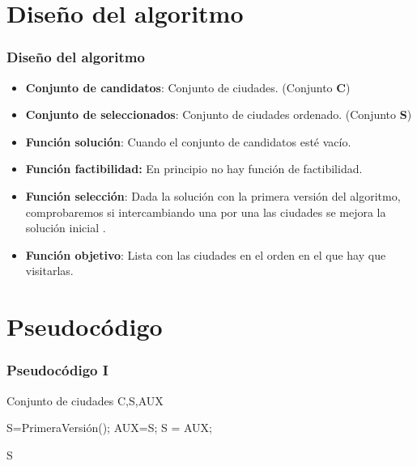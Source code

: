 \documentclass{beamer}
\begin{document}
\section{Diseño del algoritmo} 
\begin{frame}
	\frametitle{Diseño del algoritmo}
	\begin{itemize}
		\item \textbf{Conjunto de candidatos}: Conjunto de ciudades. (Conjunto \textbf{C})
		\item \textbf{Conjunto de seleccionados}: Conjunto de ciudades ordenado. (Conjunto \textbf{S})
		\item \textbf{Función solución}: Cuando el conjunto de candidatos esté vacío.
		\item \textbf{Función factibilidad:} En principio no hay función de factibilidad.
		\item \textbf{Función selección}: Dada la solución con la primera versión del algoritmo, comprobaremos si intercambiando una por una las ciudades se mejora la solución inicial .
		\item \textbf{Función objetivo}: Lista con las ciudades en el orden en el que hay que visitarlas.		
	\end{itemize}
	
\end{frame}

\section{Pseudocódigo}
\begin{frame}
	\frametitle{Pseudocódigo I}
	\begin{algorithmic}				
		\Require Conjunto de ciudades C,S,AUX
		
		\State S=PrimeraVersión();
		\State AUX=S;
			S = AUX;
		\EndIf
	
		\EndFor
		\EndFor  
		
		\Return S	
		
		
		
	\end{algorithmic}
	
	
\end{frame}
\end{document}
